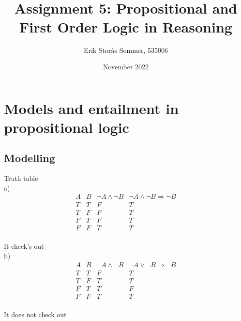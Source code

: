 \documentclass{article}
\title{Assignment 5: Propositional and First Order Logic in Reasoning}
\author{Erik Storås Sommer, 535006}
\date{November 2022}
\begin{document}
\maketitle

\section{Models and entailment in propositional logic}

\subsection{Modelling}

Truth table\\

a)\\
\begin{displaymath}
\begin{array}{|c|c|c|c|c}

A & 
B & 
\neg A \wedge \neg B &
\neg A \wedge \neg B \Rightarrow \neg B\\ %
\hline  %
T & T & F & T\\
T & F & F & T\\
F & T & F & T\\
F & F & T & T\\

\end{array}
\end{displaymath}

It check's out\\

b)\\
\begin{displaymath}
\begin{array}{|c|c|c|c|c}

A &
B & 
\neg A \wedge \neg B &
\neg A \vee \neg B \Rightarrow \neg B\\ %
\hline  %
T & T & F & T\\
T & F & T & T\\
F & T & T & F\\
F & F & T & T\\

\end{array}
\end{displaymath}

It does not check out\\
\end{document}
